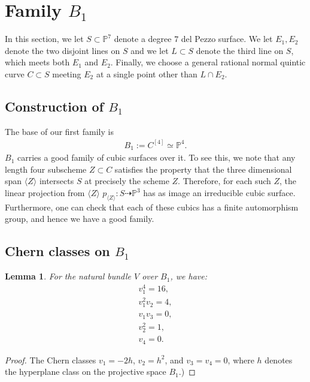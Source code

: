 \documentclass[12 pt]{amsart}
\newtheorem{lemma}{Lemma}[section]
\renewcommand{\P}{\mathbb{P}}
\newcommand{\<}{\left\langle}
\renewcommand{\>}{\right\rangle}
\begin{document}
\section{Family $B_1$}
\label{sec:first-test-family}

In this section, we let $S \subset \P^7$ denote a degree $7$ del Pezzo
surface. We let $E_{1}, E_{2}$ denote the two disjoint lines on $S$
and we let $L \subset S$ denote the third line on $S$, which meets
both $E_{1}$ and $E_{2}$. Finally, we choose a general rational normal
quintic curve $C \subset S$ meeting $E_{2}$ at a single point other
than $L \cap E_{2}$.

\subsection{Construction of $B_1$}
\label{sec:construction-b_1}


The base of our first family is
\begin{align}
  \label{eq:B1}
  B_1 := C^{[4]} \simeq \P^{4}.
\end{align}
$B_1$ carries a good family of cubic surfaces over it.  To see this,
we note that any length four subscheme $Z \subset C$ satisfies the
property that the three dimensional span $\langle Z \rangle$
intersects $S$ at precisely the scheme $Z$. Therefore, for each such
$Z$, the linear projection from $\langle Z \rangle$
$p_{\langle Z \rangle}: S \dashrightarrow \P^{3}$ has as image an
irreducible cubic surface.  Furthermore, one can check that each of
these cubics has a finite automorphism group, and hence we have a good
family.

\subsection{Chern classes on $B_1$}
\label{sec:chern-classes-b_1}

\begin{lemma}
  \label{lemma:chernB1}
  For the natural bundle $V$ over $B_1$, we have:
  \begin{align}\nonumber
    v_{1}^{4} = 16,\\\nonumber
    v_{1}^{2}v_{2} = 4,\\\nonumber
    v_{1}v_{3} =0,\\\nonumber
    v_2^{2} = 1,\\\nonumber
    v_{4} = 0.
  \end{align}
\end{lemma}

\begin{proof}
The Chern classes $v_{1} = -2h$, $v_{2}=h^2$, and $v_{3}= v_{4}=0$,
where $h$ denotes the hyperplane class on the projective space $B_1$.)
  
\end{proof}
\end{document}
